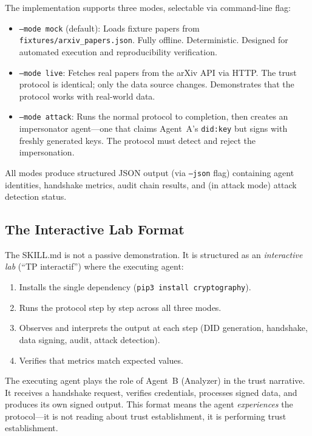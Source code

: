 \documentclass[11pt]{article}
\newcommand{\didkey}{\texttt{did:key}}
\begin{document}
The implementation supports three modes, selectable via command-line flag:

\begin{itemize}[nosep,leftmargin=1.5em]
  \item \texttt{--mode mock} (default): Loads fixture papers from \texttt{fixtures/arxiv\_papers.json}. Fully offline. Deterministic. Designed for automated execution and reproducibility verification.
  \item \texttt{--mode live}: Fetches real papers from the arXiv API via HTTP. The trust protocol is identical; only the data source changes. Demonstrates that the protocol works with real-world data.
  \item \texttt{--mode attack}: Runs the normal protocol to completion, then creates an impersonator agent---one that claims Agent~A's \didkey{} but signs with freshly generated keys. The protocol must detect and reject the impersonation.
\end{itemize}

All modes produce structured JSON output (via \texttt{--json} flag) containing agent identities, handshake metrics, audit chain results, and (in attack mode) attack detection status.

\subsection{The Interactive Lab Format}

The SKILL.md is not a passive demonstration. It is structured as an \emph{interactive lab} (``TP interactif'') where the executing agent:

\begin{enumerate}[nosep,leftmargin=1.5em]
  \item Installs the single dependency (\texttt{pip3 install cryptography}).
  \item Runs the protocol step by step across all three modes.
  \item Observes and interprets the output at each step (DID generation, handshake, data signing, audit, attack detection).
  \item Verifies that metrics match expected values.
\end{enumerate}

The executing agent plays the role of Agent~B (Analyzer) in the trust narrative. It receives a handshake request, verifies credentials, processes signed data, and produces its own signed output. This format means the agent \emph{experiences} the protocol---it is not reading about trust establishment, it is performing trust establishment.
\end{document}
